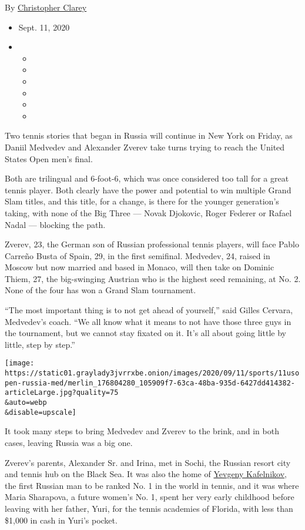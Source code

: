 By
\href{https://www.nytimes3xbfgragh.onion/by/christopher-clarey}{Christopher
Clarey}

\begin{itemize}
\item
  Sept. 11, 2020
\item
  \begin{itemize}
  \item
  \item
  \item
  \item
  \item
  \item
  \end{itemize}
\end{itemize}

Two tennis stories that began in Russia will continue in New York on
Friday, as Daniil Medvedev and Alexander Zverev take turns trying to
reach the United States Open men's final.

Both are trilingual and 6-foot-6, which was once considered too tall for
a great tennis player. Both clearly have the power and potential to win
multiple Grand Slam titles, and this title, for a change, is there for
the younger generation's taking, with none of the Big Three --- Novak
Djokovic, Roger Federer or Rafael Nadal --- blocking the path.

Zverev, 23, the German son of Russian professional tennis players, will
face Pablo Carreño Busta of Spain, 29, in the first semifinal. Medvedev,
24, raised in Moscow but now married and based in Monaco, will then take
on Dominic Thiem, 27, the big-swinging Austrian who is the highest seed
remaining, at No. 2. None of the four has won a Grand Slam tournament.

``The most important thing is to not get ahead of yourself,'' said
Gilles Cervara, Medvedev's coach. ``We all know what it means to not
have those three guys in the tournament, but we cannot stay fixated on
it. It's all about going little by little, step by step.''

\texttt{[image: https://static01.graylady3jvrrxbe.onion/images/2020/09/11/sports/11usopen-russia-med/merlin\_176804280\_105909f7-63ca-48ba-935d-6427dd414382-articleLarge.jpg?quality=75\\\&auto=webp\\\&disable=upscale]}

It took many steps to bring Medvedev and Zverev to the brink, and in
both cases, leaving Russia was a big one.

Zverev's parents, Alexander Sr. and Irina, met in Sochi, the Russian
resort city and tennis hub on the Black Sea. It was also the home of
\href{https://www.atptour.com/en/news/atp-heritage-kafelnikov-no-1-fedex-atp-rankings}{Yevgeny
Kafelnikov}, the first Russian man to be ranked No. 1 in the world in
tennis, and it was where Maria Sharapova, a future women's No. 1, spent
her very early childhood before leaving with her father, Yuri, for the
tennis academies of Florida, with less than \$1,000 in cash in Yuri's
pocket.

